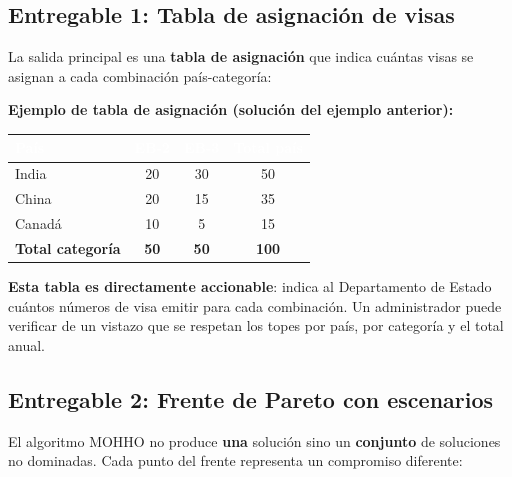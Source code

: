 \documentclass[12pt,letterpaper]{article}
\begin{document}
\subsection{Entregable 1: Tabla de asignación de visas}

La salida principal es una \textbf{tabla de asignación} que indica cuántas visas se asignan a cada combinación país-categoría:

\begin{examplebox}
\textbf{Ejemplo de tabla de asignación (solución del ejemplo anterior):}

\vspace{0.3em}
\begin{tabular}{lccc}
\toprule
\rowcolor{tablehead}
\textcolor{white}{\textbf{País}} & \textcolor{white}{\textbf{EB-2}} & \textcolor{white}{\textbf{EB-3}} & \textcolor{white}{\textbf{Total país}} \\
\midrule
India & 20 & 30 & 50 \\
\rowcolor{gray!8}
China & 20 & 15 & 35 \\
Canadá & 10 & 5 & 15 \\
\midrule
\textbf{Total categoría} & \textbf{50} & \textbf{50} & \textbf{100} \\
\bottomrule
\end{tabular}
\end{examplebox}

\textbf{Esta tabla es directamente accionable}: indica al Departamento de Estado cuántos números de visa emitir para cada combinación. Un administrador puede verificar de un vistazo que se respetan los topes por país, por categoría y el total anual.

\subsection{Entregable 2: Frente de Pareto con escenarios}

El algoritmo MOHHO no produce \textbf{una} solución sino un \textbf{conjunto} de soluciones no dominadas. Cada punto del frente representa un compromiso diferente:
\end{document}
